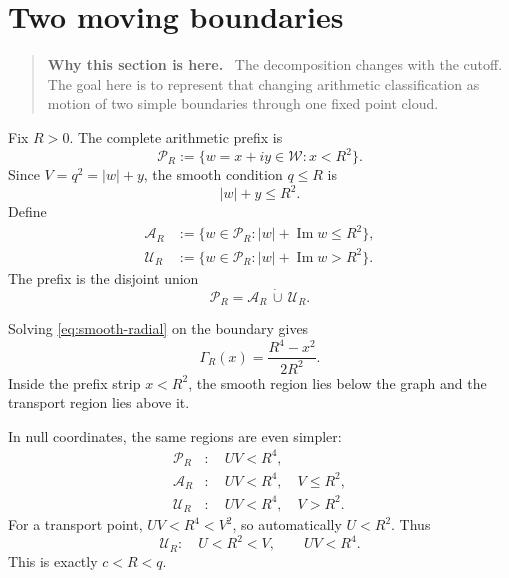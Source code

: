 \documentclass[11pt]{article}
\theoremstyle{definition}
\theoremstyle{remark}
\newcommand{\1}{\mathbf{1}}
\newcommand{\Impart}{\operatorname{Im}}
\newenvironment{motivation}
  {\begin{quote}\small\color{ovvogray}\textbf{Why this section is here.}\ }
  {\end{quote}}
\begin{document}
\section{Two moving boundaries}
\label{sec:moving-cutoff}

\begin{motivation}
The decomposition changes with the cutoff.  The goal here is to represent that changing arithmetic classification as motion of two simple boundaries through one fixed point cloud.
\end{motivation}

Fix $R>0$.  The complete arithmetic prefix is
\begin{equation}
 \mathscr P_R
 :=\{w=x+iy\in\mathscr W:x<R^2\}.
 \label{eq:prefix-region}
\end{equation}
Since $V=q^2=|w|+y$, the smooth condition $q\le R$ is
\begin{equation}
 |w|+y\le R^2.
 \label{eq:smooth-radial}
\end{equation}
Define
\begin{align}
 \mathscr A_R
 &:={\{w\in\mathscr P_R:|w|+\Impart w\le R^2\}},
 \label{eq:A-region}\\
 \mathscr U_R
 &:={\{w\in\mathscr P_R:|w|+\Impart w>R^2\}}.
 \label{eq:U-region}
\end{align}
The prefix is the disjoint union
\begin{equation}
 \mathscr P_R=\mathscr A_R\,\dot\cup\,\mathscr U_R.
 \label{eq:region-partition}
\end{equation}

Solving \cref{eq:smooth-radial} on the boundary gives
\begin{equation}
 \boxed{
 \Gamma_R(x)=\frac{R^4-x^2}{2R^2}.
 }
 \label{eq:Gamma-R}
\end{equation}
Inside the prefix strip $x<R^2$, the smooth region lies below the graph and the transport region lies above it.

In null coordinates, the same regions are even simpler:
\begin{align}
 \mathscr P_R&:\quad UV<R^4,
 \label{eq:prefix-UV}\\
 \mathscr A_R&:\quad UV<R^4,\quad V\le R^2,
 \label{eq:smooth-UV}\\
 \mathscr U_R&:\quad UV<R^4,\quad V>R^2.
 \label{eq:transport-UV}
\end{align}
For a transport point, $UV<R^4<V^2$, so automatically $U<R^2$.  Thus
\begin{equation}
 \mathscr U_R:\quad U<R^2<V,
 \qquad
 UV<R^4.
 \label{eq:transport-null-clean}
\end{equation}
This is exactly $c<R<q$.
\end{document}
